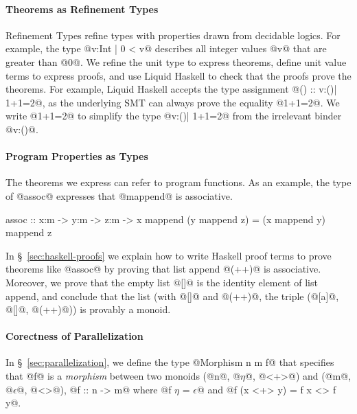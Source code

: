 \paragraph{Theorems as Refinement Types}
Refinement Types refine types with properties
drawn from decidable logics.
For example, the type @{v:Int | 0 < v}@
describes all integer values @v@ that are greater than @0@.
%
We refine the unit type to express theorems,
define unit value terms to express proofs, and use
Liquid Haskell to check that the proofs prove the theorems.
%
For example, Liquid Haskell accepts
the type assignment @() :: {v:()| 1+1=2}@,
as the underlying SMT can always prove the equality @1+1=2@.
%
We write @{1+1=2}@ to simplify the type @{v:()| 1+1=2}@
from the irrelevant binder @v:()@.

\paragraph{Program Properties as Types}
The theorems we express can refer to program functions.
As an example, the type of @assoc@ expresses that @mappend@
is associative.
%
\begin{code}
assoc :: x:m -> y:m -> z:m -> {x mappend (y mappend z) = (x mappend y) mappend z}
\end{code}
%
In \S~\ref{sec:haskell-proofs} we explain
how to write Haskell proof terms to prove theorems like @assoc@
by proving that list append @(++)@ is associative.
%
Moreover, we prove that the empty list @[]@ is the identity element of
list append, and conclude that the list
(with @[]@ and @(++)@, \ie the triple (@[a]@, @[]@, @(++)@))
is provably a monoid.

\paragraph{Corectness of Parallelization}
In \S~\ref{sec:parallelization}, we define the type @Morphism n m f@ that specifies
that @f@ is a \textit{morphism} between two monoids
(@n@, @$\eta$@, @<+>@) and (@m@, @$\epsilon$@, @<>@),
\ie @f :: n -> m@ where @f $\eta$ = $\epsilon$@ and @f (x <+> y) = f x <> f y@.

